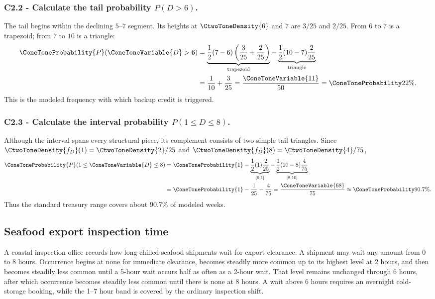 \subsubsection*{C2.2 - Calculate the tail probability $P(D>6)$.}
\label{subsec:c2-piecewise-linear-liquidity-b}
The tail begins within the declining $5$--$7$ segment.  Its heights at $\CtwoToneDensity{6}$ and
$7$ are $3/25$ and $2/25$.  From $6$ to $7$ is a trapezoid; from $7$ to $10$
is a triangle:
\[
 \begin{aligned}
 \ConeToneProbability{P}(\ConeToneVariable{D}>6)
 &=\underbrace{\frac12(7-6)\left(\frac3{25}+\frac2{25}\right)}_{\text{trapezoid}}
 +\underbrace{\frac12(10-7)\frac2{25}}_{\text{triangle}}\\
 &=\frac1{10}+\frac3{25}=\frac{\ConeToneVariable{11}}{50}=\ConeToneProbability{22\%}.
 \end{aligned}
\]
This is the modeled frequency with which backup credit is triggered.

\subsubsection*{C2.3 - Calculate the interval probability $P(1\le D\le8)$.}
\label{subsec:c2-piecewise-linear-liquidity-c}
Although the interval spans every structural piece, its complement consists
of two simple tail triangles.  Since $\CtwoToneDensity{f_D}(1)=\CtwoToneDensity{2}/25$ and $\CtwoToneDensity{f_D}(8)=\CtwoToneDensity{4}/75$,
\[
 \begin{aligned}
 \ConeToneProbability{P}(1\le \ConeToneVariable{D}\le8)
 &=\ConeToneProbability{1}-\underbrace{\frac12(1)\frac2{25}}_{[0,1]}
     -\underbrace{\frac12(10-8)\frac4{75}}_{[8,10]}\\
 &=\ConeToneProbability{1}-\frac1{25}-\frac4{75}=\frac{\ConeToneVariable{68}}{75}\approx\ConeToneProbability{90.7\%}.
 \end{aligned}
\]
Thus the standard treasury range covers about $90.7\%$ of modeled weeks.

\subsection{Seafood export inspection time}\label{sec:c2-piecewise-linear-inspection}
A coastal inspection office records how long chilled seafood shipments wait
for export clearance.  A shipment may wait any amount from 0 to 8 hours.
Occurrence begins at none for immediate clearance, becomes steadily
more common up to its highest level at 2 hours, and then becomes steadily less
common until a 5-hour wait occurs half as often as a 2-hour wait.  That level
remains unchanged through 6 hours, after which occurrence becomes steadily less
common until there is none at 8 hours.  A wait above 6 hours requires
an overnight cold-storage booking, while the 1--7 hour band is covered by the
ordinary inspection shift.

